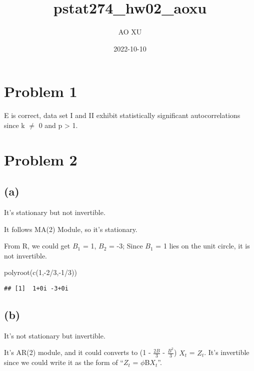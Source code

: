 \documentclass[
]{article}
\title{pstat274\_hw02\_aoxu}
\author{AO XU}
\date{2022-10-10}
\newenvironment{Shaded}{\begin{snugshade}}{\end{snugshade}}
\newcommand{\DecValTok}[1]{\textcolor[rgb]{0.00,0.00,0.81}{#1}}
\newcommand{\FunctionTok}[1]{\textcolor[rgb]{0.00,0.00,0.00}{#1}}
\newcommand{\NormalTok}[1]{#1}
\newcommand{\SpecialCharTok}[1]{\textcolor[rgb]{0.00,0.00,0.00}{#1}}
\begin{document}
\maketitle

\hypertarget{problem-1}{%
\section{Problem 1}\label{problem-1}}

E is correct, data set I and II exhibit statistically significant
autocorrelations since k \(\neq\) 0 and p \textgreater{} 1.

\hypertarget{problem-2}{%
\section{Problem 2}\label{problem-2}}

\hypertarget{a}{%
\subsection{(a)}\label{a}}

It's stationary but not invertible.

It follows MA(2) Module, so it's stationary.

From R, we could get \(B_1\) = 1, \(B_2\) = -3; Since \(B_1\) = 1 lies
on the unit circle, it is not invertible.

\begin{Shaded}
\begin{Highlighting}[]
\FunctionTok{polyroot}\NormalTok{(}\FunctionTok{c}\NormalTok{(}\DecValTok{1}\NormalTok{,}\SpecialCharTok{{-}}\DecValTok{2}\SpecialCharTok{/}\DecValTok{3}\NormalTok{,}\SpecialCharTok{{-}}\DecValTok{1}\SpecialCharTok{/}\DecValTok{3}\NormalTok{))}
\end{Highlighting}
\end{Shaded}

\begin{verbatim}
## [1]  1+0i -3+0i
\end{verbatim}

\hypertarget{b}{%
\subsection{(b)}\label{b}}

It's not stationary but invertible.

It's AR(2) module, and it could converts to (1 - \(\frac{2B}{3}\) -
\(\frac{B^2}{3}\)) \(X_t\) = \(Z_t\). It's invertible since we could
write it as the form of ``\(Z_t\) = \(\phi\)B\(X_t\)''.
\end{document}
